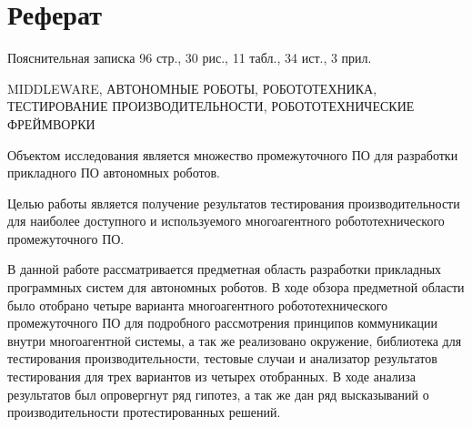 \chapter*{Реферат}
\setcounter{page}{4}

Пояснительная записка 96 стр., 30 рис., 11 табл., 34 ист., 3 прил.

\uppercase{Middleware, автономные роботы, робототехника, тестирование производительности, робототехнические фреймворки}

Объектом исследования является множество промежуточного ПО для разработки прикладного ПО автономных роботов.

Целью работы является получение результатов тестирования производительности для наиболее доступного и используемого многоагентного робототехнического промежуточного ПО.

В данной работе рассматривается предметная область разработки прикладных программных систем для автономных роботов. В ходе обзора предметной области было отобрано четыре варианта многоагентного робототехнического промежуточного ПО для подробного рассмотрения принципов коммуникации внутри многоагентной системы, а так же реализовано окружение, библиотека для тестирования производительности, тестовые случаи и анализатор результатов тестирования для трех вариантов из четырех отобранных. В ходе анализа результатов был опровергнут ряд гипотез, а так же дан ряд высказываний о производительности протестированных решений.


